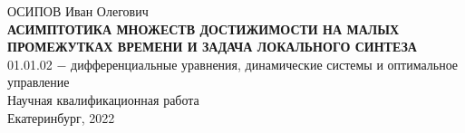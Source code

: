 \documentclass[../main.tex]{subfiles}
\begin{document}
	\begin{titlepage}
	    \begin{center}
        \vspace*{5cm}
		\Large{ОСИПОВ Иван Олегович}\\
		\vspace{2cm}
		\large{\textbf{АСИМПТОТИКА МНОЖЕСТВ ДОСТИЖИМОСТИ НА МАЛЫХ ПРОМЕЖУТКАХ ВРЕМЕНИ И ЗАДАЧА ЛОКАЛЬНОГО СИНТЕЗА}}\\
		\vspace{1cm}
		01.01.02 $-$ дифференциальные уравнения, динамические системы и оптимальное управление\\
		\vspace{1cm}
		\textsf{Научная квалификационная работа}\\
	    \vspace{\fill}
	    \large{Екатеринбург, 2022}
	    \end{center}
	\end{titlepage}
\end{document}
